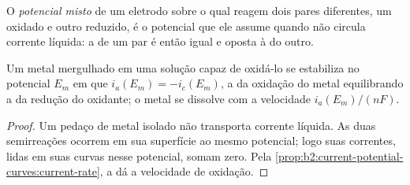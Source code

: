 \begin{definition}\label{def:b2:batteries-electrolysis:mixed-potential}
O \emph{potencial misto} de um eletrodo sobre o qual reagem
dois pares diferentes, um oxidado e outro reduzido, é o potencial que ele
assume quando não circula corrente líquida: a  de um par é
então igual e oposta à  do outro.
\end{definition}

\begin{proposition}\label{prop:b2:batteries-electrolysis:mixed}
Um metal mergulhado em uma solução capaz de oxidá-lo se estabiliza no
potencial $E_m$ em que $i_a(E_m) = -i_c(E_m)$, a  da oxidação
do metal equilibrando a  da redução do oxidante; o metal se
dissolve com a velocidade $i_a(E_m)/(nF)$.
\end{proposition}

\begin{proof}
Um pedaço de metal isolado não transporta corrente líquida. As duas
semirreações ocorrem em sua superfície ao mesmo potencial; logo suas correntes,
lidas em suas curvas nesse potencial, somam zero. Pela
\cref{prop:b2:current-potential-curves:current-rate}, a  dá a
velocidade de oxidação.
\end{proof}


